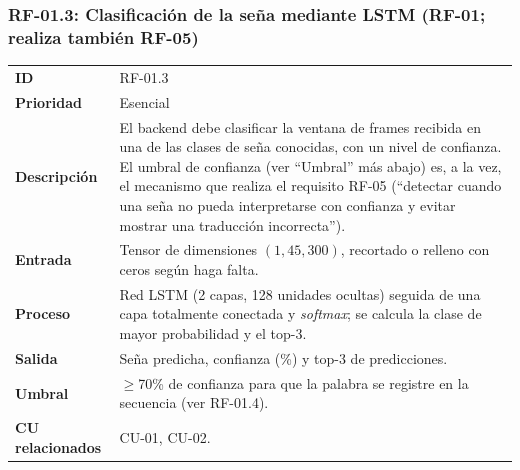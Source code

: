 \subsubsection{RF-01.3: Clasificación de la seña mediante LSTM (RF-01; realiza también RF-05)}
\begin{table}[H]
\centering
\begin{tabularx}{\textwidth}{l X}
\toprule
\textbf{ID} & RF-01.3 \\
\textbf{Prioridad} & Esencial \\
\textbf{Descripción} & El backend debe clasificar la ventana de frames recibida en una de las clases de seña conocidas, con un nivel de confianza. El umbral de confianza (ver ``Umbral'' más abajo) es, a la vez, el mecanismo que realiza el requisito RF-05 (``detectar cuando una seña no pueda interpretarse con confianza y evitar mostrar una traducción incorrecta''). \\
\textbf{Entrada} & Tensor de dimensiones $(1, 45, 300)$, recortado o relleno con ceros según haga falta. \\
\textbf{Proceso} & Red LSTM (2 capas, 128 unidades ocultas) seguida de una capa totalmente conectada y \textit{softmax}; se calcula la clase de mayor probabilidad y el top-3. \\
\textbf{Salida} & Seña predicha, confianza (\%) y top-3 de predicciones. \\
\textbf{Umbral} & $\geq$70\% de confianza para que la palabra se registre en la secuencia (ver RF-01.4). \\
\textbf{CU relacionados} & CU-01, CU-02. \\
\bottomrule
\end{tabularx}
\end{table}

